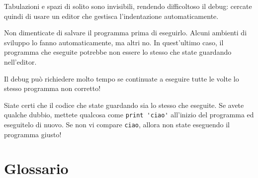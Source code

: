 \documentclass[10pt]{book}
\begin{document}
Tabulazioni e spazi di solito sono invisibili, rendendo difficoltoso il debug: cercate quindi di usare un editor che gestisca l'indentazione automaticamente.

Non dimenticate di salvare il programma prima di eseguirlo. Alcuni ambienti di sviluppo lo fanno automaticamente, ma altri no. In quest'ultimo caso, il programma che eseguite potrebbe non essere lo stesso che state guardando nell'editor.

Il debug può richiedere molto tempo se continuate a eseguire tutte le volte lo stesso programma non corretto!

Siate certi che il codice che state guardando sia lo stesso che eseguite. Se avete qualche dubbio, mettete qualcosa come \verb"print 'ciao'" all'inizio del programma ed eseguitelo di nuovo. Se non vi compare \verb"ciao", allora non state eseguendo il programma giusto!




\section{Glossario}
\end{document}
